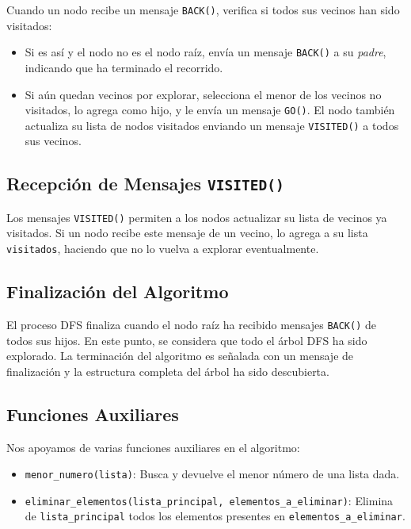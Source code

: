 Cuando un nodo recibe un mensaje \texttt{BACK()}, verifica si todos sus vecinos han sido visitados:

\begin{itemize}
	\item Si es así y el nodo no es el nodo raíz, envía un mensaje \texttt{BACK()} a su \textit{padre}, indicando que ha terminado el recorrido.
	\item Si aún quedan vecinos por explorar, selecciona el menor de los vecinos no visitados, lo agrega como hijo, y le envía un mensaje \texttt{GO()}. El nodo también actualiza su lista de nodos visitados enviando un mensaje \texttt{VISITED()} a todos sus vecinos.
\end{itemize}

\subsection{Recepción de Mensajes \texttt{VISITED()}}

Los mensajes \texttt{VISITED()} permiten a los nodos actualizar su lista de vecinos ya visitados. Si un nodo recibe este mensaje de un vecino, lo agrega a su lista \texttt{visitados}, haciendo que no lo vuelva a explorar eventualmente.

\subsection{Finalización del Algoritmo}

El proceso DFS finaliza cuando el nodo raíz ha recibido mensajes \texttt{BACK()} de todos sus hijos. En este punto, se considera que todo el árbol DFS ha sido explorado. La terminación del algoritmo es señalada con un mensaje de finalización y la estructura completa del árbol ha sido descubierta.

\subsection{Funciones Auxiliares}

Nos apoyamos de varias funciones auxiliares en el algoritmo:

\begin{itemize}
	\item \texttt{menor\_numero(lista)}: Busca y devuelve el menor número de una lista dada. 
	\item \texttt{eliminar\_elementos(lista\_principal, elementos\_a\_eliminar)}: Elimina de \texttt{lista\_principal} todos los elementos presentes en \texttt{elementos\_a\_eliminar}.
\end{itemize}
